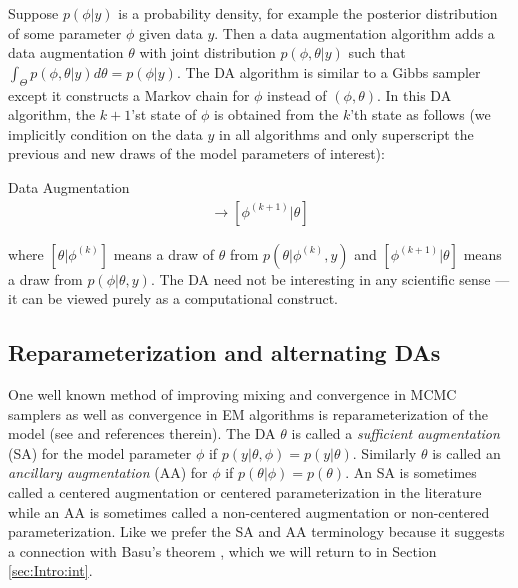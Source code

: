 \documentclass[12pt]{article}
\begin{document}
Suppose $p(\phi|y)$ is a probability density, for example the posterior distribution of some parameter $\phi$ given data $y$. %
Then a data augmentation algorithm adds a data augmentation $\theta$ with joint distribution $p(\phi,\theta|y)$ such that $\int_{\Theta}p(\phi,\theta|y)d\theta = p(\phi|y)$. The DA algorithm is similar to a Gibbs sampler except it constructs a Markov chain for $\phi$ instead of $(\phi, \theta)$. In this DA algorithm, the $k+1$'st state of $\phi$ is obtained from the $k$'th state as follows (we implicitly condition on the data $y$ in all algorithms and only superscript the previous and new draws of the model parameters of interest):
\begin{alg*}[DA]Data Augmentation\label{alg:DA}
  \begin{align*}
  [\theta|\phi^{(k)}] \to [\phi^{(k+1)}|\theta]
\end{align*}
\end{alg*}
\noindent where $[\theta|\phi^{(k)}]$ means a draw of $\theta$ from $p(\theta|\phi^{(k)},y)$ and $[\phi^{(k+1)}|\theta]$ means a draw from $p(\phi|\theta,y)$. The DA need not be interesting in any scientific sense --- it can be viewed purely as a computational construct. 

\subsection{Reparameterization and alternating DAs}

One well known method of improving mixing and convergence in MCMC samplers as well as convergence in EM algorithms is reparameterization of the model (see  \citet{papaspiliopoulos2007general} and references therein). The DA $\theta$ is called a {\it sufficient augmentation} (SA) for the model parameter $\phi$ if $p(y|\theta,\phi)=p(y|\theta)$. Similarly $\theta$ is called an {\it ancillary augmentation} (AA) for $\phi$ if $p(\theta|\phi)=p(\theta)$. An SA is sometimes called a centered augmentation or centered parameterization in the literature while an AA is sometimes called a non-centered augmentation or non-centered parameterization. Like \citet{yu2011center} we prefer the SA and AA terminology because it suggests a connection with Basu's theorem \citep{basu1955statistics}, which we will return to in Section \ref{sec:Intro:int}.
\end{document}
